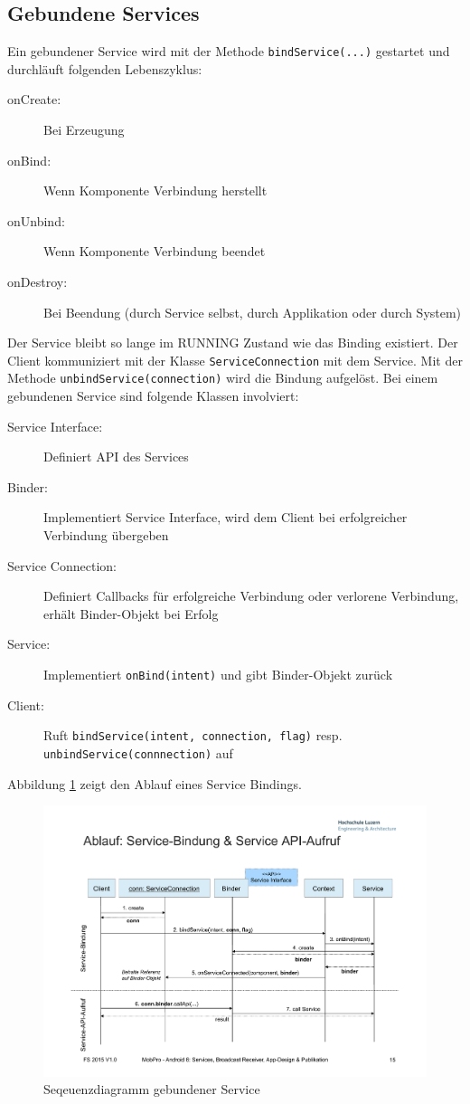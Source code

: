 \subsection{Gebundene Services}

Ein gebundener Service wird mit der Methode \texttt{bindService(...)} gestartet und durchläuft folgenden Lebenszyklus:
\begin{description}
	\item[onCreate:] Bei Erzeugung
	\item[onBind:] Wenn Komponente Verbindung herstellt
	\item[onUnbind:] Wenn Komponente Verbindung beendet
	\item[onDestroy:] Bei Beendung (durch Service selbst, durch Applikation oder durch System)
\end{description}
Der Service bleibt so lange im RUNNING Zustand wie das Binding existiert. Der Client kommuniziert mit der Klasse \texttt{ServiceConnection} mit dem Service. Mit der Methode \texttt{unbindService(connection)} wird die Bindung aufgelöst. Bei einem gebundenen Service sind folgende Klassen involviert:
\begin{description}
	\item[Service Interface:] Definiert API des Services
	\item[Binder:] Implementiert Service Interface, wird dem Client bei erfolgreicher Verbindung übergeben
	\item[Service Connection:] Definiert Callbacks für erfolgreiche Verbindung oder verlorene Verbindung, erhält Binder-Objekt bei Erfolg
	\item[Service:] Implementiert \texttt{onBind(intent)} und gibt Binder-Objekt zurück
	\item[Client:] Ruft \texttt{bindService(intent, connection, flag)} resp. \texttt{unbindService(connnection)} auf
\end{description}
Abbildung \ref{fig:gebundener-service} zeigt den Ablauf eines Service Bindings.

\begin{figure}
\centering
\includegraphics[width=0.7\linewidth]{fig/gebundener-service}
\caption{Seqeuenzdiagramm gebundener Service}
\label{fig:gebundener-service}
\end{figure}

